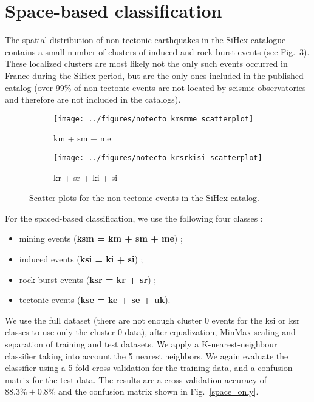 \newpage
\section{Space-based classification}
The spatial distribution of non-tectonic earthquakes in the SiHex catalogue contains a small number of clusters of induced and rock-burst events (see Fig.~\ref{fg:notecto_space}). These localized clusters are most likely not the only such events occurred in France during the SiHex period, but are the only ones included in the published catalog (over 99\% of non-tectonic events are not located by seismic observatories and therefore are not included in the catalogs). 

\begin{figure}
\centering
\begin{subfigure}[t]{0.45\textwidth}
	\centering
	\texttt{[image: ../figures/notecto\_kmsmme\_scatterplot]}
	\caption{km + sm + me} 
	\label{notecto_kmsmme}
\end{subfigure}
\begin{subfigure}[t]{0.45\textwidth}
	\centering
	\texttt{[image: ../figures/notecto\_krsrkisi\_scatterplot]}
	\caption{kr + sr + ki + si}
	\label{notecto_krsrkisi}
\end{subfigure}
\caption{Scatter plots for the non-tectonic events in the SiHex catalog. }
\label{fg:notecto_space}
\end{figure}


For the spaced-based classification, we use the following four classes : 
\begin{itemize}
\item mining events ({\bf ksm = km + sm + me}) ;
\item induced events ({\bf ksi = ki + si}) ;
\item rock-burst events ({\bf ksr = kr + sr}) ;
\item tectonic events ({\bf kse = ke + se + uk}).
\end{itemize}

We use the full dataset (there are not enough cluster 0 events for the ksi or ksr classes to use only the cluster 0 data), after equalization, MinMax scaling and separation of training and test datasets. We apply a K-nearest-neighbour classifier taking into account the 5 nearest neighbors. We again evaluate the classifier using a 5-fold cross-validation for the training-data, and a confusion matrix for the test-data. The results are a cross-validation accuracy of $88.3\% \pm 0.8\%$ and the confusion matrix shown in Fig.~\ref{space_only}.

